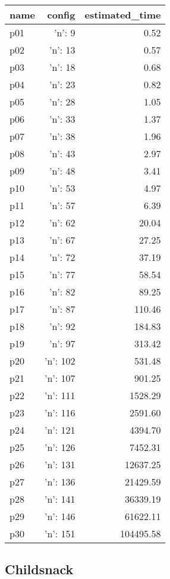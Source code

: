 \documentclass{article}
\begin{document}
                            \begin{center}
                            \scriptsize
                            \begin{tabular}{@{}l|r|r@{}}
                            name & config & estimated\_time\\\midrule
                              p01&{'n': 9}&0.52\\
  p02&{'n': 13}&0.57\\
  p03&{'n': 18}&0.68\\
  p04&{'n': 23}&0.82\\
  p05&{'n': 28}&1.05\\
  p06&{'n': 33}&1.37\\
  p07&{'n': 38}&1.96\\
  p08&{'n': 43}&2.97\\
  p09&{'n': 48}&3.41\\
  p10&{'n': 53}&4.97\\
  p11&{'n': 57}&6.39\\
  p12&{'n': 62}&20.04\\
  p13&{'n': 67}&27.25\\
  p14&{'n': 72}&37.19\\
  p15&{'n': 77}&58.54\\
  p16&{'n': 82}&89.25\\
  p17&{'n': 87}&110.46\\
  p18&{'n': 92}&184.83\\
  p19&{'n': 97}&313.42\\
  p20&{'n': 102}&531.48\\
  p21&{'n': 107}&901.25\\
  p22&{'n': 111}&1528.29\\
  p23&{'n': 116}&2591.60\\
  p24&{'n': 121}&4394.70\\
  p25&{'n': 126}&7452.31\\
  p26&{'n': 131}&12637.25\\
  p27&{'n': 136}&21429.59\\
  p28&{'n': 141}&36339.19\\
  p29&{'n': 146}&61622.11\\
  p30&{'n': 151}&104495.58
                            \end{tabular}
                            \end{center}
                    
                            \newpage \subsection{Childsnack}
\end{document}
